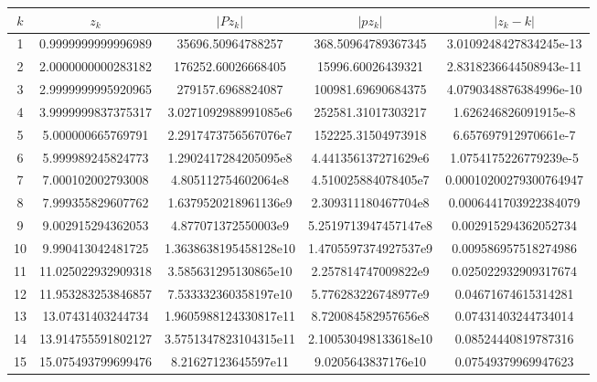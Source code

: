 \documentclass[15pt, a4paper]{article}
\begin{document}
\begin{table}[ht]
    \begin{adjustbox}{max width=\textwidth}
    \begin{tabular}{|c|c|c|c|c|}
        \hline
    \(k\) & \(z_k\) & \(|Pz_k|\) & \(|pz_k|\) & \(|z_k - k|\) \\
        \hline
        1 & 0.9999999999996989 & 35696.50964788257 & 368.50964789367345 & 3.0109248427834245e-13 \\
        \hline
        2 & 2.0000000000283182 & 176252.60026668405 & 15996.60026439321 & 2.8318236644508943e-11 \\
        \hline
        3 & 2.9999999995920965 & 279157.6968824087 & 100981.69690684375 & 4.0790348876384996e-10 \\
        \hline
        4 & 3.9999999837375317 & 3.0271092988991085e6 & 252581.31017303217 & 1.626246826091915e-8 \\
        \hline
        5 & 5.000000665769791 & 2.2917473756567076e7 & 152225.31504973918 & 6.657697912970661e-7 \\
        \hline
        6 & 5.999989245824773 & 1.2902417284205095e8 & 4.441356137271629e6 & 1.0754175226779239e-5 \\
        \hline
        7 & 7.000102002793008 & 4.805112754602064e8 & 4.510025884078405e7 & 0.00010200279300764947 \\
        \hline
        8 & 7.999355829607762 & 1.6379520218961136e9 & 2.309311180467704e8 & 0.0006441703922384079 \\
        \hline
        9 & 9.002915294362053 & 4.877071372550003e9 & 5.2519713947457147e8 & 0.002915294362052734 \\
        \hline
        10 & 9.990413042481725 & 1.3638638195458128e10 & 1.4705597374927537e9 & 0.009586957518274986 \\
        \hline
        11 & 11.025022932909318 & 3.585631295130865e10 & 2.257814747009822e9 & 0.025022932909317674 \\
        \hline
        12 & 11.953283253846857 & 7.533332360358197e10 & 5.776283226748977e9 & 0.04671674615314281 \\
        \hline
        13 & 13.07431403244734 & 1.9605988124330817e11 & 8.720084582957656e8 & 0.07431403244734014 \\
        \hline
        14 & 13.914755591802127 & 3.5751347823104315e11 & 2.100530498133618e10 & 0.08524440819787316 \\
        \hline
        15 & 15.075493799699476 & 8.21627123645597e11 & 9.0205643837176e10 & 0.07549379969947623 \\

\end{tabular}
\end{adjustbox}
\end{table}
\end{document}
